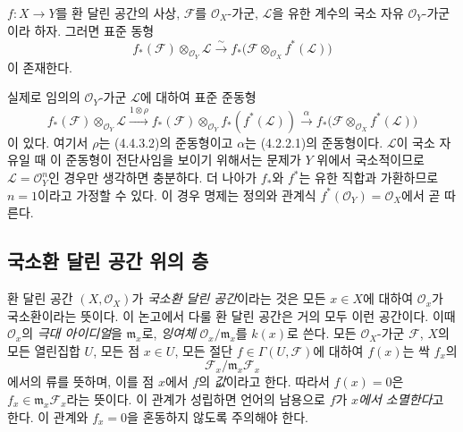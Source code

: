 \begin{env}[5.4.10]
\label{0.5.4.10-ko}
$f:X\to Y$를 환 달린 공간의 사상, $\mathcal F$를
$\mathcal O_X$-가군, $\mathcal L$을 유한 계수의 국소 자유
$\mathcal O_Y$-가군이라 하자. 그러면 표준 동형
\[
  f_*(\mathcal F)\otimes_{\mathcal O_Y}\mathcal L
  \xrightarrow{\sim}
  f_*\bigl(\mathcal F\otimes_{\mathcal O_X}f^*(\mathcal L)\bigr)
  \tag{5.4.10.1}\label{0.5.4.10.1-ko}
\]
이 존재한다.


실제로 임의의 $\mathcal O_Y$-가군 $\mathcal L$에 대하여 표준 준동형
\[
  f_*(\mathcal F)\otimes_{\mathcal O_Y}\mathcal L
  \xrightarrow{1\otimes\rho}
  f_*(\mathcal F)\otimes_{\mathcal O_Y}f_*(f^*(\mathcal L))
  \xrightarrow{\alpha}
  f_*\bigl(\mathcal F\otimes_{\mathcal O_X}f^*(\mathcal L)\bigr)
\]
이 있다. 여기서 $\rho$는 (4.4.3.2)의 준동형이고 $\alpha$는
(4.2.2.1)의 준동형이다. $\mathcal L$이 국소 자유일 때 이 준동형이
전단사임을 보이기 위해서는 문제가 $Y$ 위에서 국소적이므로
$\mathcal L=\mathcal O_Y^n$인 경우만 생각하면 충분하다. 더 나아가
$f_*$와 $f^*$는 유한 직합과 가환하므로 $n=1$이라고 가정할 수 있다.
이 경우 명제는 정의와 관계식 $f^*(\mathcal O_Y)=\mathcal O_X$에서
곧 따른다.
\end{env}

\subsection{국소환 달린 공간 위의 층}
\label{subsection:0.5.5-ko}

\begin{env}[5.5.1]
\label{0.5.5.1-ko}
환 달린 공간 $(X,\mathcal O_X)$가 \emph{국소환 달린 공간}이라는 것은
모든 $x\in X$에 대하여 $\mathcal O_x$가 국소환이라는 뜻이다. 이
논고에서 다룰 환 달린 공간은 거의 모두 이런 공간이다. 이때
$\mathcal O_x$의 \emph{극대 아이디얼}을 $\mathfrak m_x$로,
\emph{잉여체} $\mathcal O_x/\mathfrak m_x$를 $k(x)$로 쓴다. 모든
$\mathcal O_X$-가군 $\mathcal F$, $X$의 모든 열린집합 $U$, 모든 점
$x\in U$, 모든 절단 $f\in\Gamma(U,\mathcal F)$에 대하여 $f(x)$는
싹 $f_x$의
\[
  \mathcal F_x/\mathfrak m_x\mathcal F_x
\]
에서의 류를 뜻하며, 이를 점 $x$에서 $f$의 \emph{값}이라고 한다.
따라서 $f(x)=0$은
$f_x\in\mathfrak m_x\mathcal F_x$라는 뜻이다. 이 관계가 성립하면
언어의 남용으로 $f$가 \emph{$x$에서 소멸한다}고 한다. 이 관계와
$f_x=0$을 혼동하지 않도록 주의해야 한다.
\end{env}

